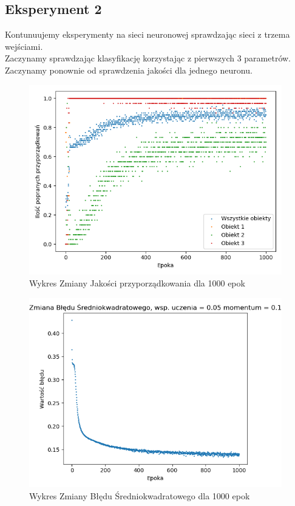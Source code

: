 \documentclass[12pt]{article}
\begin{document}
\newpage

\subsection {Eksperyment 2}

Kontunuujemy eksperymenty na sieci neuronowej sprawdzając sieci z trzema wejściami.\\
Zaczynamy sprawdzając klasyfikację korzystając z pierwszych 3 parametrów.\\
Zaczynamy ponownie od sprawdzenia jakości dla jednego neuronu.\\ 

\newpage
\begin{figure}[!ht]
 \centering
 \includegraphics[width=11cm]{WykresPrzyporzadkowania1neuron3wejscia1.png}
 \caption{Wykres Zmiany Jakości przyporządkowania dla 1000 epok}
 \vspace{-0.1cm}
 \label{WykresPrzyp3}
\end{figure}

\begin{figure}[!ht]
 \centering
 \includegraphics[width=11cm]{WykresBlad1neuron3wejscia1.png}
 \caption{Wykres Zmiany Błędu Średniokwadratowego dla 1000 epok}
 \vspace{-0.1cm}
 \label{WykresBlad3}
\end{figure}
\newpage
\end{document}
